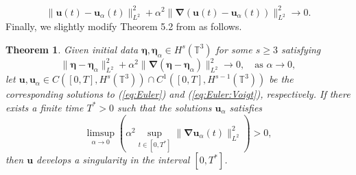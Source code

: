 \documentclass[12pt]{article}
\def\u{\boldsymbol u}
\def\ua{\boldsymbol u_\alpha}
\def\bn{\boldsymbol \nabla}
\def\be{\boldsymbol \eta}
\def\bea{\boldsymbol \eta_\alpha}
\def\TT{\mathbb{T}}
\newtheorem{thm}{Theorem}[section]
\numberwithin{equation}{section}
\begin{document}
\begin{equation}
\|\u(t)-\ua(t)\|_{L^2}^2 + \alpha^2\|\bn(\u(t)-\ua(t))\|_{L^2}^2 \rightarrow 0.
\end{equation}
Finally, we slightly modify Theorem 5.2 from \cite{larios_higher-order_2010} as follows.
\begin{thm}\label{thm:Theorem:1.3}
Given initial data $\be,\bea \in H^s(\TT^3)$ for some $s\geq 3$ satisfying
\begin{equation}
\|\be-\bea\|_{L^2}^2+\alpha^2\|\bn(\be-\bea)\|_{L^2}^2 \rightarrow 0, \quad \text{as } \alpha\rightarrow 0,
\end{equation} 
let $\u,\ua \in C([0,T],H^s(\TT^3))\cap C^1([0,T],H^{s-1}(\TT^3))$ be the corresponding solutions to (\ref{eq:Euler}) and (\ref{eq:Euler:Voigt}), respectively. If there exists a finite time $T^*>0$ such that the solutions $\ua$ satisfies
\begin{equation}
\limsup_{\alpha \rightarrow 0} \left( \alpha^2 \sup_{t\in[0,T^*]} \|\bn \ua(t)\|_{L^2}^2\right) > 0,
\end{equation}
then $\u$ develops a singularity in the interval $[0,T^*]$.
\end{thm}
\end{document}
